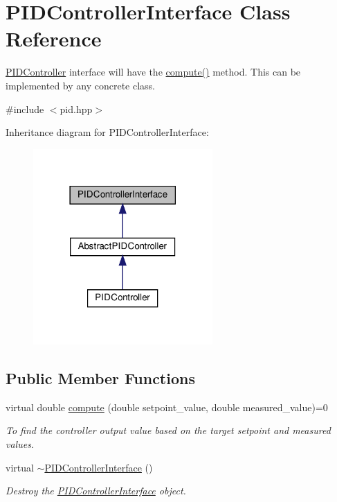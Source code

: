\hypertarget{classPIDControllerInterface}{}\section{P\+I\+D\+Controller\+Interface Class Reference}
\label{classPIDControllerInterface}


\hyperlink{classPIDController}{P\+I\+D\+Controller} interface will have the \hyperlink{classPIDControllerInterface_a6b5340968cb9d235cf3b52bd61c973e1}{compute()} method. This can be implemented by any concrete class.  




{\ttfamily \#include $<$pid.\+hpp$>$}



Inheritance diagram for P\+I\+D\+Controller\+Interface\+:\nopagebreak
\begin{figure}[H]
\begin{center}
\leavevmode
\includegraphics[width=194pt]{classPIDControllerInterface__inherit__graph}
\end{center}
\end{figure}
\subsection*{Public Member Functions}
\begin{DoxyCompactItemize}
\item 
virtual double \hyperlink{classPIDControllerInterface_a6b5340968cb9d235cf3b52bd61c973e1}{compute} (double setpoint\+\_\+value, double measured\+\_\+value)=0
\begin{DoxyCompactList}\small\item\em To find the controller output value based on the target setpoint and measured values. \end{DoxyCompactList}\item 
\mbox{\label{classPIDControllerInterface_a96ae6d60601a238ddf999cee5fe705a0}} 
virtual \hyperlink{classPIDControllerInterface_a96ae6d60601a238ddf999cee5fe705a0}{$\sim$\+P\+I\+D\+Controller\+Interface} ()
\begin{DoxyCompactList}\small\item\em Destroy the \hyperlink{classPIDControllerInterface}{P\+I\+D\+Controller\+Interface} object. \end{DoxyCompactList}\end{DoxyCompactItemize}


